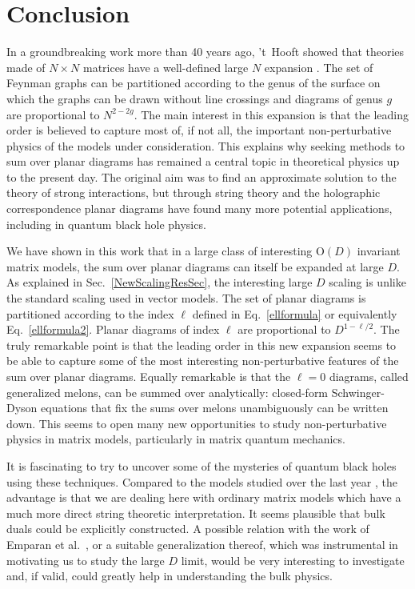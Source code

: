 \documentclass[12pt]{article}
\numberwithin{equation}{section}
\begin{document}
%
\section{\label{s4Sec} Conclusion}
%

In a groundbreaking work more than 40 years ago, 't~Hooft showed that theories made of $N\times N$ matrices have a well-defined large $N$ expansion \cite{tHooftplanar}. The set of Feynman graphs can be partitioned according to the genus of the surface on which the graphs can be drawn without line crossings and diagrams of genus $g$ are proportional to $N^{2-2g}$. The main interest in this expansion is that the leading order is believed to capture most of, if not all, the important non-perturbative physics of the models under consideration. This explains why seeking methods to sum over planar diagrams has remained a central topic in theoretical physics up to the present day. The original aim was to 
find an approximate solution to the theory of strong interactions, but through string theory and the holographic correspondence planar diagrams have found many more potential applications, including in quantum black hole physics.

We have shown in this work that in a large class of interesting $\text{O}(D)$ invariant matrix models, the sum over planar diagrams can itself be expanded at large $D$. As explained in Sec.\ \ref{NewScalingResSec}, the interesting large $D$ scaling is unlike the standard scaling used in vector models. The set of planar diagrams is partitioned according to the index $\ell$ defined in Eq.\ \eqref{ellformula} or equivalently Eq.\ \eqref{ellformula2}. Planar diagrams of index $\ell$ are proportional to $D^{1-\ell/2}$. The truly remarkable point is that the leading order in this new expansion seems to be able to capture some of the most interesting non-perturbative features of the sum over planar diagrams. Equally remarkable is that the $\ell=0$ diagrams, called generalized melons, can be summed over analytically: closed-form Schwinger-Dyson equations that fix the sums over melons unambiguously can be written down. This seems to open many new opportunities to study non-perturbative physics in matrix models, particularly in matrix quantum mechanics. 

It is fascinating to try to uncover some of the mysteries of quantum black holes using these techniques. Compared to the models studied over the last year \cite{Kitaevetal, witten, wittenmore, klebanov}, the advantage is that we are dealing here with ordinary matrix models which have a much more direct string theoretic interpretation. It seems plausible that bulk duals could be explicitly constructed. A possible relation with the work of Emparan et al.\ \cite{Emparan}, or a suitable generalization thereof, which was instrumental in motivating us to study the large $D$ limit, would be very interesting to investigate and, if valid, could greatly help in understanding the bulk physics.
\end{document}
